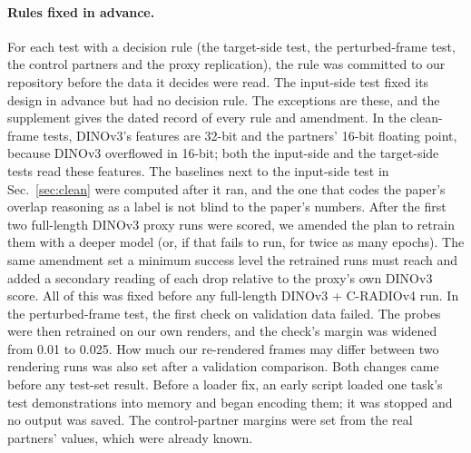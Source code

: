 \paragraph{Rules fixed in advance.}
For each test with a decision rule (the target-side test, the perturbed-frame test, the control partners and the proxy replication), the rule was committed to our repository before the data it decides were read.
The input-side test fixed its design in advance but had no decision rule.
The exceptions are these, and the supplement gives the dated record of every rule and amendment.
In the clean-frame tests, DINOv3's features are 32-bit and the partners' 16-bit floating point, because DINOv3 overflowed in 16-bit; both the input-side and the target-side tests read these features.
The baselines next to the input-side test in Sec.~\ref{sec:clean} were computed after it ran, and the one that codes the paper's overlap reasoning as a label is not blind to the paper's numbers.
After the first two full-length DINOv3 proxy runs were scored, we amended the plan to retrain them with a deeper model (or, if that fails to run, for twice as many epochs).
The same amendment set a minimum success level the retrained runs must reach and added a secondary reading of each drop relative to the proxy's own DINOv3 score.
All of this was fixed before any full-length DINOv3 + C-RADIOv4 run.
In the perturbed-frame test, the first check on validation data failed.
The probes were then retrained on our own renders, and the check's margin was widened from 0.01 to 0.025.
How much our re-rendered frames may differ between two rendering runs was also set after a validation comparison.
Both changes came before any test-set result.
Before a loader fix, an early script loaded one task's test demonstrations into memory and began encoding them; it was stopped and no output was saved.
The control-partner margins were set from the real partners' values, which were already known.
